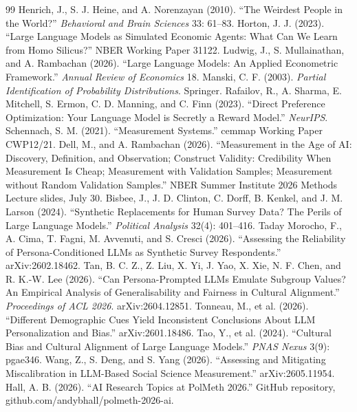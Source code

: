 \documentclass[10pt,letterpaper]{article}
\begin{document}
\begin{thebibliography}{99}
 Henrich, J., S. J. Heine, and A. Norenzayan (2010). ``The Weirdest People in the World?'' \textit{Behavioral and Brain Sciences} 33: 61--83.
 Horton, J. J. (2023). ``Large Language Models as Simulated Economic Agents: What Can We Learn from Homo Silicus?'' NBER Working Paper 31122.
 Ludwig, J., S. Mullainathan, and A. Rambachan (2026). ``Large Language Models: An Applied Econometric Framework.'' \textit{Annual Review of Economics} 18.
 Manski, C. F. (2003). \textit{Partial Identification of Probability Distributions}. Springer.
 Rafailov, R., A. Sharma, E. Mitchell, S. Ermon, C. D. Manning, and C. Finn (2023). ``Direct Preference Optimization: Your Language Model is Secretly a Reward Model.'' \textit{NeurIPS}.
 Schennach, S. M. (2021). ``Measurement Systems.'' cemmap Working Paper CWP12/21.
 Dell, M., and A. Rambachan (2026). ``Measurement in the Age of AI: Discovery, Definition, and Observation; Construct Validity: Credibility When Measurement Is Cheap; Measurement with Validation Samples; Measurement without Random Validation Samples.'' NBER Summer Institute 2026 Methods Lecture slides, July 30.
 Bisbee, J., J. D. Clinton, C. Dorff, B. Kenkel, and J. M. Larson (2024). ``Synthetic Replacements for Human Survey Data? The Perils of Large Language Models.'' \textit{Political Analysis} 32(4): 401--416.
 Taday Morocho, F., A. Cima, T. Fagni, M. Avvenuti, and S. Cresci (2026). ``Assessing the Reliability of Persona-Conditioned LLMs as Synthetic Survey Respondents.'' arXiv:2602.18462.
 Tan, B. C. Z., Z. Liu, X. Yi, J. Yao, X. Xie, N. F. Chen, and R. K.-W. Lee (2026). ``Can Persona-Prompted LLMs Emulate Subgroup Values? An Empirical Analysis of Generalisability and Fairness in Cultural Alignment.'' \textit{Proceedings of ACL 2026}. arXiv:2604.12851.
 Tonneau, M., et al. (2026). ``Different Demographic Cues Yield Inconsistent Conclusions About LLM Personalization and Bias.'' arXiv:2601.18486.
 Tao, Y., et al. (2024). ``Cultural Bias and Cultural Alignment of Large Language Models.'' \textit{PNAS Nexus} 3(9): pgae346.
 Wang, Z., S. Deng, and S. Yang (2026). ``Assessing and Mitigating Miscalibration in LLM-Based Social Science Measurement.'' arXiv:2605.11954.
 Hall, A. B. (2026). ``AI Research Topics at PolMeth 2026.'' GitHub repository, github.com/andybhall/polmeth-2026-ai.

\end{thebibliography}
\end{document}
